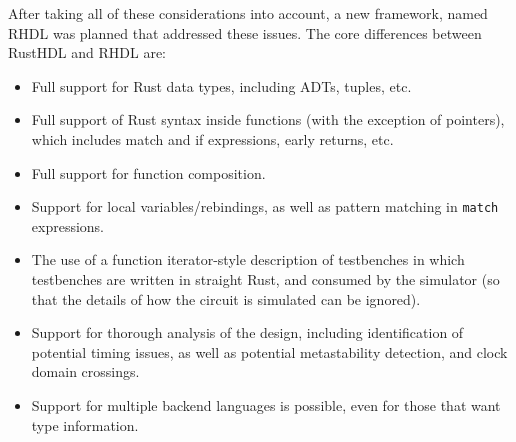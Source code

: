 \documentclass[conference]{IEEEtran}
\begin{document}
After taking all of these considerations into account, a new framework, named RHDL was planned that addressed these issues.  The 
core differences between RustHDL and RHDL are:

\begin{itemize}
  \item Full support for Rust data types, including ADTs, tuples, etc.
  \item Full support of Rust syntax inside functions (with the exception of pointers), which includes 
  match and if expressions, early returns, etc.
  \item Full support for function composition.
  \item Support for local variables/rebindings, as well as pattern matching in \verb|match| expressions.
  \item The use of a function iterator-style description of testbenches in which testbenches are written in 
  straight Rust, and consumed by the simulator (so that the details of how the circuit is simulated can be ignored).
  \item Support for thorough analysis of the design, including identification of potential timing issues, as well as
  potential metastability detection, and clock domain crossings.
  \item Support for multiple backend languages is possible, even for those that want type information.
\end{itemize}
\end{document}

